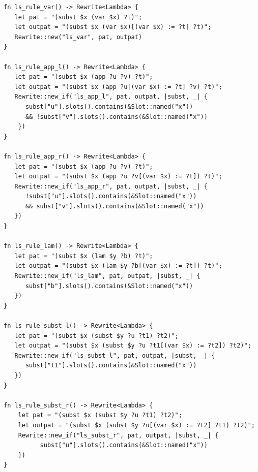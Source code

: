 \begin{listing*}
	\centering
\begin{minipage}{0.8\textwidth}
	\begin{verbatim}
fn ls_rule_var() -> Rewrite<Lambda> {
   let pat = "(subst $x (var $x) ?t)";
   let outpat = "(subst $x (var $x)[(var $x) := ?t] ?t)";
   Rewrite::new("ls_var", pat, outpat)
}

fn ls_rule_app_l() -> Rewrite<Lambda> {
   let pat = "(subst $x (app ?u ?v) ?t)";
   let outpat = "(subst $x (app ?u[(var $x) := ?t] ?v) ?t)";
   Rewrite::new_if("ls_app_l", pat, outpat, |subst, _| {
      subst["u"].slots().contains(&Slot::named("x")) 
	  && !subst["v"].slots().contains(&Slot::named("x"))
    })
}

fn ls_rule_app_r() -> Rewrite<Lambda> {
   let pat = "(subst $x (app ?u ?v) ?t)";
   let outpat = "(subst $x (app ?u ?v[(var $x) := ?t]) ?t)";
   Rewrite::new_if("ls_app_r", pat, outpat, |subst, _| {
      !subst["u"].slots().contains(&Slot::named("x")) 
	  && subst["v"].slots().contains(&Slot::named("x"))
   })
}

fn ls_rule_lam() -> Rewrite<Lambda> {
   let pat = "(subst $x (lam $y ?b) ?t)";
   let outpat = "(subst $x (lam $y ?b[(var $x) := ?t]) ?t)";
   Rewrite::new_if("ls_lam", pat, outpat, |subst, _| {
      subst["b"].slots().contains(&Slot::named("x"))
   })
}

fn ls_rule_subst_l() -> Rewrite<Lambda> {
   let pat = "(subst $x (subst $y ?u ?t1) ?t2)";
   let outpat = "(subst $x (subst $y ?u ?t1[(var $x) := ?t2]) ?t2)";
   Rewrite::new_if("ls_subst_l", pat, outpat, |subst, _| {
      subst["t1"].slots().contains(&Slot::named("x"))
   })
}

fn ls_rule_subst_r() -> Rewrite<Lambda> {
    let pat = "(subst $x (subst $y ?u ?t1) ?t2)";
    let outpat = "(subst $x (subst $y ?u[(var $x) := ?t2] ?t1) ?t2)";
    Rewrite::new_if("ls_subst_r", pat, outpat, |subst, _| {
          subst["u"].slots().contains(&Slot::named("x"))
    })
}
	\end{verbatim}
\end{minipage}
	\caption{$\lambda_{\text{lsub}}$ $ls$-rules}
	\label{listing:lsub_ls_rules}
\end{listing*}

\clearpage

